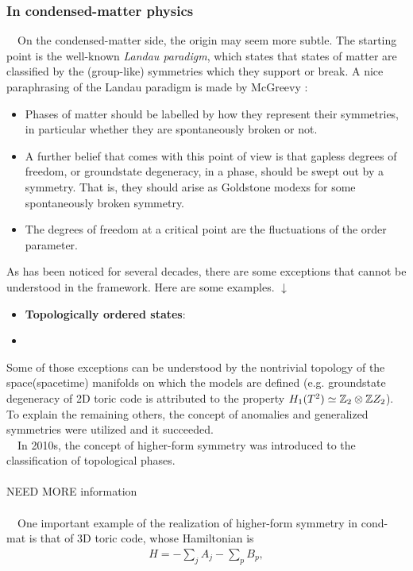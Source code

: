 \documentclass{ltjsarticle}
\theoremstyle{mystyle} %
\numberwithin{equation}{section}
\begin{document}
\subsubsection{In condensed-matter physics}
　On the condensed-matter side, the origin may seem more subtle. 
The starting point is the well-known \textit{Landau paradigm}, 
which states that states of matter are classified by the (group-like) symmetries which they support or break. 
A nice paraphrasing of the Landau paradigm is made by McGreevy
\cite{MG}: 
\begin{itemize}
    \item Phases of matter should be labelled by how they represent their symmetries, 
    in particular whether they are spontaneously broken or not. 
    \item A further belief that comes with this point of view is that
    gapless degrees of freedom, or groundstate degeneracy, in a phase, should be swept out by a symmetry. 
    That is, they should arise as Goldstone modexs for some spontaneously broken symmetry. 
    \item The degrees of freedom at a critical point are the fluctuations of the order parameter. 
\end{itemize}
As has been noticed for several decades, there are some exceptions 
that cannot be understood in the framework. Here are some examples. $\downarrow$
\begin{itemize}
    \item \textbf{Topologically ordered states}: 
    \item 
\end{itemize}
Some of those exceptions can be understood by the nontrivial topology of the space(spacetime) manifolds 
on which the models are defined (e.g. groundstate degeneracy of 2D toric code is attributed to the property $H_1(T^2)\simeq \mathbb{Z}_2\otimes \mathbb{Z}{Z}_2$). 
To explain the remaining others, the concept of anomalies and generalized symmetries were utilized and it succeeded. \\
　In 2010s, the concept of higher-form symmetry was introduced to the classification of topological phases. \\
\\
\color{red}
NEED MORE information
\color{black}
\\
\\
　One important example of the realization of higher-form symmetry in cond-mat is that of 3D toric code, whose Hamiltonian is 
\begin{align}
    H=-\sum_j A_j - \sum_p B_p, 
    \label{TCmodel}
\end{align}
\end{document}

